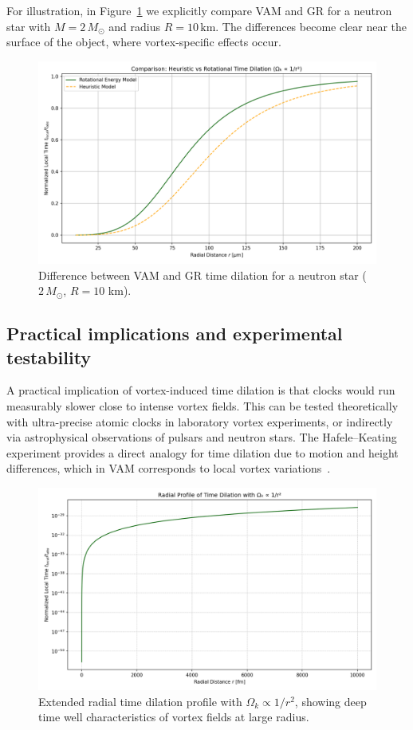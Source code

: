 For illustration, in Figure~\ref{fig:comparisonVAMGR} we explicitly compare VAM and GR for a neutron star with $M = 2\,M_\odot$ and radius $R = 10\,\text{km}$. The differences become clear near the surface of the object, where vortex-specific effects occur.

\begin{figure}[ht!]
    \centering
    \includegraphics[width=0.7\linewidth]{images/04-RotationalVsHeuristicTimeDilation}
    \caption{Difference between VAM and GR time dilation for a neutron star ($2\,M_\odot$, $R=10$ km).}
    \label{fig:comparisonVAMGR}
\end{figure}

\subsection{Practical implications and experimental testability}

A practical implication of vortex-induced time dilation is that clocks would run measurably slower close to intense vortex fields. This can be tested theoretically with ultra-precise atomic clocks in laboratory vortex experiments, or indirectly via astrophysical observations of pulsars and neutron stars. The Hafele–Keating experiment provides a direct analogy for time dilation due to motion and height differences, which in VAM corresponds to local vortex variations~\cite{hafele1972around}.

\begin{figure}[ht!]
    \centering
    \includegraphics[width=0.7\linewidth]{images/05-LogarithmicDecayLocalTime}
    \caption{Extended radial time dilation profile with $\Omega_k \propto 1/r^2$, showing deep time well characteristics of vortex fields at large radius.}
    \label{fig:NewGraph}
\end{figure}
